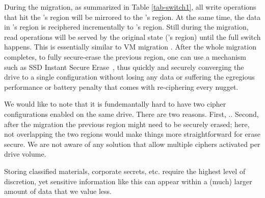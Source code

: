
During the migration, as summarized in Table \ref{tab-switch1}, all write
operations that hit the \cone's region will be mirrored to the \ctwo's
region.  At the same time, the data in \cone's region is reciphered
incrementally to \ctwo's region.  Still during the migration, read
operations will be served by the original state (\cone's region) until the
full switch happens.  This is essentially similar to VM migration
\cite{google-live-vm-migration-nsdi}.  After the whole migration
completes, to fully secure-erase the previous region, one can use a
mechanism such as SSD Instant Secure Erase~\cite{ISE1,ISE2,ISE3}, thus
quickly and securely converging the drive to a single configuration
without losing any data or suffering the egregious performance or battery
penalty that comes with re-ciphering every nugget.

We would like to note that it is fundemantally hard to have two cipher
configurations enabled on the same drive.  There are two reasons.  First,
..  Second,
after the migration the previous region might need to be securely erased;
here, not overlapping the two regions would make things more
straightforward for erase secure.  We are not aware of any solution that
allow multiple ciphers activated per drive volume.







Storing classified materials, corporate secrets, etc. require the highest level
of discretion, yet sensitive information like this can appear within a (much)
larger amount of data that we value less. 


